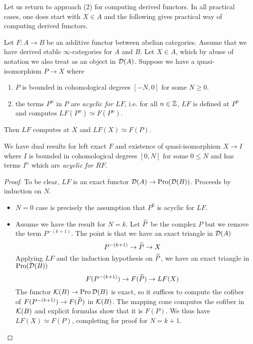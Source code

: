 \documentclass{article}
\begin{document}
Let us return to approach (2) for computing derived functors.
In all practical cases, one does start with $X \in A$ and
the following gives practical way of computing derived functors.
\begin{prop}
  \label{derived:acyclic_res}
  Let $F : A \to B$ be an additive functor between abelian categories.
  Assume that we have derived stable $\infty$-categories
  for $A$ and $B$.
  Let $X \in A$, which by abuse of notation
  we also treat as an object in $\mathcal{D}(A)$.
  Suppose we have a quasi-isomorphism $P \to X$
  where \begin{enumerate}
    \item $P$ is bounded in cohomological degrees $[-N , 0]$
    for some $N \geq 0$.
    \item the terms $P^n$ in $P$ are \emph{acyclic for $LF$},
    i.e. for all $n \in \mathbb{Z}$, $LF$ is defined at $P^n$
    and computes $LF(P^n) \simeq F(P^n)$.
  \end{enumerate}
  Then $LF$ computes at $X$ and $LF(X) \simeq F(P)$.

  We have dual results for left exact $F$ and 
  existence of quasi-isomorphism $X \to I$
  where $I$ is bounded in cohomological degrees $[0 , N]$ for some $0 \leq N$
  and has terms $I^n$ which are \emph{acyclic for $RF$}.
\end{prop}
\begin{proof}
  To be clear, $LF$ is an exact functor
  $\mathcal{D}(A) \to \mathrm{Pro}(\mathcal{D}(B))$.
  Proceeds by induction on $N$.
  \begin{itemize}
    \item $N = 0$ case is precisely the assumption that $P^0$ is
    acyclic for $LF$.
    \item Assume we have the result for $N = k$.
    Let $\widetilde{P}$ be the complex $P$ but we remove the term $P^{-(k+1)}$.
    The point is that we have an exact triangle in $\mathcal{D}(A)$
    \[
      P^{-(k+1)} \to \widetilde{P} \to X
    \]
    Applying $LF$ and the induction hypothesis on $\widetilde{P}$,
    we have an exact triangle in $\mathrm{Pro}(\mathcal{D}(B))$
    \[
      F(P^{-(k+1)}) \to F(\widetilde{P}) \to LF(X)
    \]
    The functor $\mathcal{K}(B) \to \mathrm{Pro}\,\mathcal{D}(B)$ is exact,
    so it suffices to compute the cofiber
    of $F(P^{-(k+1)}) \to F(\widetilde{P})$ in $\mathcal{K}(B)$.
    The mapping cone computes the cofiber in $\mathcal{K}(B)$
    and explicit formulas show that it is $F(P)$.
    We thus have $LF(X) \simeq F(P)$, completing for proof for $N = k + 1$.
  \end{itemize}
\end{proof}
\end{document}
